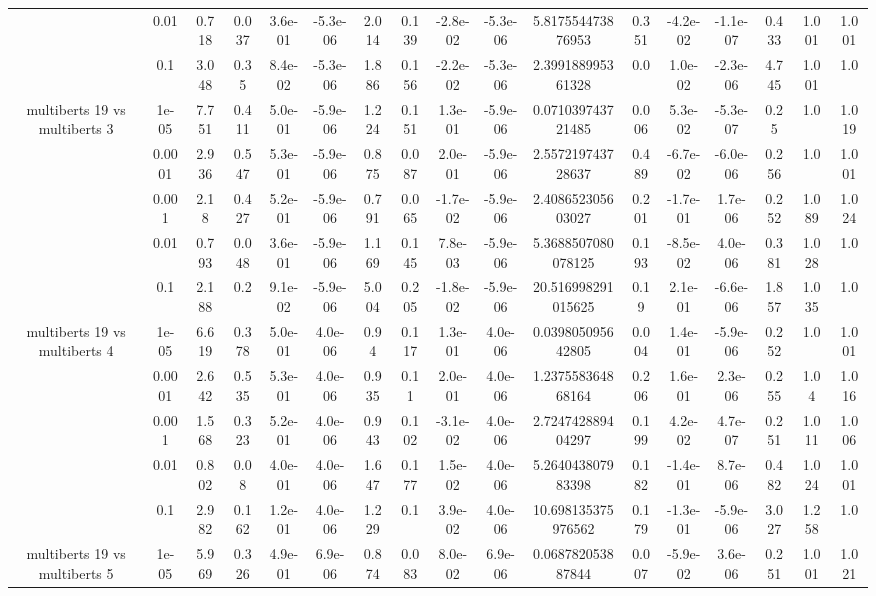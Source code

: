 \begin{tabular}{|c|c|c|c|c|c|c|c|c|c|c|c|c|c|c|c|c|}
 & 0.01 & 0.718 & 0.037 & 3.6e-01 & -5.3e-06 & 2.014 & 0.139 & -2.8e-02 & -5.3e-06 & 5.817554473876953 & 0.351 & -4.2e-02 & -1.1e-07 & 0.433 & 1.001 & 1.001 \\
 & 0.1 & 3.048 & 0.35 & 8.4e-02 & -5.3e-06 & 1.886 & 0.156 & -2.2e-02 & -5.3e-06 & 2.399188995361328 & 0.0 & 1.0e-02 & -2.3e-06 & 4.745 & 1.001 & 1.0 \\
\hline
\multirow{5}{*}{multiberts 19 vs multiberts 3} & 1e-05 & 7.751 & 0.411 & 5.0e-01 & -5.9e-06 & 1.224 & 0.151 & 1.3e-01 & -5.9e-06 & 0.071039743721485 & 0.006 & 5.3e-02 & -5.3e-07 & 0.25 & 1.0 & 1.019 \\
 & 0.0001 & 2.936 & 0.547 & 5.3e-01 & -5.9e-06 & 0.875 & 0.087 & 2.0e-01 & -5.9e-06 & 2.557219743728637 & 0.489 & -6.7e-02 & -6.0e-06 & 0.256 & 1.0 & 1.001 \\
 & 0.001 & 2.18 & 0.427 & 5.2e-01 & -5.9e-06 & 0.791 & 0.065 & -1.7e-02 & -5.9e-06 & 2.408652305603027 & 0.201 & -1.7e-01 & 1.7e-06 & 0.252 & 1.089 & 1.024 \\
 & 0.01 & 0.793 & 0.048 & 3.6e-01 & -5.9e-06 & 1.169 & 0.145 & 7.8e-03 & -5.9e-06 & 5.3688507080078125 & 0.193 & -8.5e-02 & 4.0e-06 & 0.381 & 1.028 & 1.0 \\
 & 0.1 & 2.188 & 0.2 & 9.1e-02 & -5.9e-06 & 5.004 & 0.205 & -1.8e-02 & -5.9e-06 & 20.516998291015625 & 0.19 & 2.1e-01 & -6.6e-06 & 1.857 & 1.035 & 1.0 \\
\hline
\multirow{5}{*}{multiberts 19 vs multiberts 4} & 1e-05 & 6.619 & 0.378 & 5.0e-01 & 4.0e-06 & 0.94 & 0.117 & 1.3e-01 & 4.0e-06 & 0.039805095642805 & 0.004 & 1.4e-01 & -5.9e-06 & 0.252 & 1.0 & 1.001 \\
 & 0.0001 & 2.642 & 0.535 & 5.3e-01 & 4.0e-06 & 0.935 & 0.11 & 2.0e-01 & 4.0e-06 & 1.237558364868164 & 0.206 & 1.6e-01 & 2.3e-06 & 0.255 & 1.04 & 1.016 \\
 & 0.001 & 1.568 & 0.323 & 5.2e-01 & 4.0e-06 & 0.943 & 0.102 & -3.1e-02 & 4.0e-06 & 2.724742889404297 & 0.199 & 4.2e-02 & 4.7e-07 & 0.251 & 1.011 & 1.006 \\
 & 0.01 & 0.802 & 0.08 & 4.0e-01 & 4.0e-06 & 1.647 & 0.177 & 1.5e-02 & 4.0e-06 & 5.264043807983398 & 0.182 & -1.4e-01 & 8.7e-06 & 0.482 & 1.024 & 1.001 \\
 & 0.1 & 2.982 & 0.162 & 1.2e-01 & 4.0e-06 & 1.229 & 0.1 & 3.9e-02 & 4.0e-06 & 10.698135375976562 & 0.179 & -1.3e-01 & -5.9e-06 & 3.027 & 1.258 & 1.0 \\
\hline
\multirow{5}{*}{multiberts 19 vs multiberts 5} & 1e-05 & 5.969 & 0.326 & 4.9e-01 & 6.9e-06 & 0.874 & 0.083 & 8.0e-02 & 6.9e-06 & 0.068782053887844 & 0.007 & -5.9e-02 & 3.6e-06 & 0.251 & 1.001 & 1.021 \\

\end{tabular}
